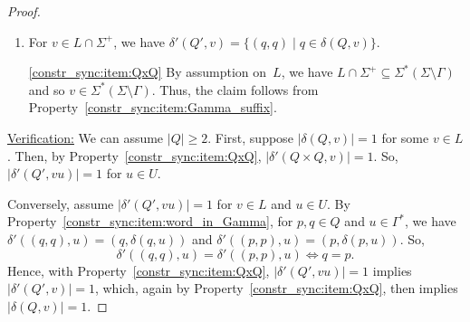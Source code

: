 \begin{proof}
\begin{enumerate}
		\item \label{constr_sync:item:QxQ}  For $v \in L \cap \Sigma^+$, 
		we have  $\delta'(Q', v) = \{(q,q) \mid q \in \delta(Q, v) \}$.
		
		\begin{proofitem}{\ref{constr_sync:item:QxQ}}
		By assumption on~$L$,
		we have $L \cap \Sigma^+ \subseteq \Sigma^*( \Sigma \setminus \Gamma )$
		and so $v \in \Sigma^* (\Sigma \setminus \Gamma)$.
		Thus, the claim follows from Property~\ref{constr_sync:item:Gamma_suffix}.		
		\end{proofitem}
	\end{enumerate}	
	
	\medskip 
	\noindent\underline{Verification:} We can assume $|Q| \ge 2$.
	First, suppose $|\delta(Q, v) | = 1$ for some $v \in L$.
	Then, by Property~\ref{constr_sync:item:QxQ}, $|\delta'(Q \times Q, v)| = 1$.
	So, $|\delta'(Q', vu)| = 1$ for $u \in U$.	
	
	Conversely, assume $|\delta'(Q', vu)| = 1$
	for $v \in L$ and $u \in U$. %
	By Property~\ref{constr_sync:item:word_in_Gamma}, for $p,q \in Q$ and $u \in \Gamma^*$,
	we have $\delta'((q,q), u) = (q, \delta(q, u))$ and $\delta'((p,p), u) = (p, \delta(p, u))$.
	So,
	\[
	\delta'((q,q), u) = \delta'((p,p), u)
	\Leftrightarrow 
	q = p.
	\]
	Hence, with Property~\ref{constr_sync:item:QxQ}, $|\delta'(Q', vu)| = 1$
	implies $|\delta'(Q', v)| = 1$,
	which, again by Property~\ref{constr_sync:item:QxQ}, then implies $|\delta(Q, v)| = 1$.	
%	
%	
%	
%	
%	
%	
%	
%	
%	
\end{proof} 

